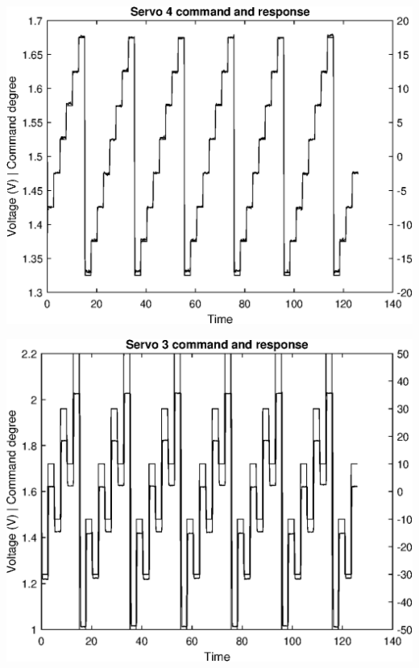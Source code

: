 \includegraphics[width=\SchematicWidth]{images/Servos/ramp.eps}

\includegraphics[width=\SchematicWidth]{images/Servos/random.eps}
